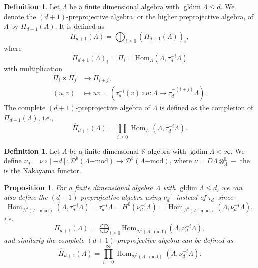\documentclass[a4paper, reqno]{amsart}
\newtheorem{myprop}[mythm]{Proposition}
\theoremstyle{definition}
\newtheorem{mydef}[mythm]{Definition}
\newcommand{\K}{\mathbb{K}}
\DeclareMathOperator{\Hom}{\mathrm{Hom}}
\DeclareMathOperator{\gldim}{\mathrm{gldim}}
\begin{document}
\begin{mydef}\cite[Definition 2.11]{IO13Stablecateofhigherpreproj}
	Let $\Lambda$ be a finite dimensional algebra with $\gldim \Lambda \le d$. We denote the $(d+1)$-preprojective algebra, or the higher preprojective algebra, of $\Lambda$ by $\Pi_{d+1}(\Lambda)$. It is defined as
	\begin{equation*}
		\Pi_{d+1}(\Lambda) = \bigoplus_{i\ge 0}(\Pi_{d+1}(\Lambda))_i,
	\end{equation*}
	where
	\begin{equation*}
		\Pi_{d+1}(\Lambda)_i = \Pi_i = \mathrm{Hom}_\Lambda(\Lambda, \tau_d^{-i}\Lambda)
	\end{equation*}
	with multiplication
	\begin{equation*}
		\begin{aligned}
			\Pi_i\times \Pi_j&\to \Pi_{i+j}, \\
			(u, v)&\mapsto uv = (\tau^{-i}_d(v)\circ u: \Lambda\to \tau_d^{-(i+j)}\Lambda).
		\end{aligned}
	\end{equation*}
	The complete $(d+1)$-preprojective algebra of $\Lambda$ is defined as the completion of $\Pi_{d+1}(\Lambda)$, i.e.,
	\begin{equation*}
		\widehat{\Pi}_{d+1}(\Lambda) = \prod_{i\ge 0} \Hom_\Lambda(\Lambda, \tau^{-i}_d\Lambda).
	\end{equation*}
\end{mydef}

\begin{mydef}
	Let $\Lambda$ be a finite dimensional $\K$-algebra with $\gldim \Lambda < \infty$. We define $\nu_d = \nu\circ [-d]: \mathcal{D}^b(\Lambda\mathrm{-mod})\to \mathcal{D}^b(\Lambda\mathrm{-mod})$, where $\nu = D\Lambda\otimes_\Lambda^\mathbb{L}-$ the is the Nakayama functor.
\end{mydef}

\begin{myprop}
	For a finite dimensional algebra $\Lambda$ with $\gldim \Lambda \le d$, we can also define the $(d+1)$-preprojective algebra using $\nu_d^{-1}$ instead of $\tau_d^-$ since
	\begin{equation}\label{eq - derived prop preprojective}
		\Hom_{\mathcal{D}^b(\Lambda\mathrm{-mod})}(\Lambda, \tau_d^{-i}\Lambda) = \tau_d^{-i}\Lambda = H^0(\nu_d^{-i}\Lambda) = \Hom_{\mathcal{D}^b(\Lambda\mathrm{-mod})}(\Lambda, \nu_d^{-i}\Lambda),
	\end{equation}
	i.e.
	\begin{equation}\label{Remark - definition of derived preprojective algebra}
		\Pi_{d+1}(\Lambda) = \bigoplus_{i\ge 0}\mathrm{Hom}_{\mathcal{D}^b(\Lambda\mathrm{-mod})}(\Lambda, \nu_d^{-i}\Lambda),
	\end{equation}
	and similarly the complete $(d+1)$-preprojective algebra can be defined as
	\begin{equation*}
		\widehat{\Pi}_{d+1}(\Lambda) = \prod_{i=0}^\infty \Hom_{\mathcal{D}^b(\Lambda\mathrm{-mod})}(\Lambda, \nu^{-i}_d\Lambda).
	\end{equation*}
\end{myprop}
\end{document}
